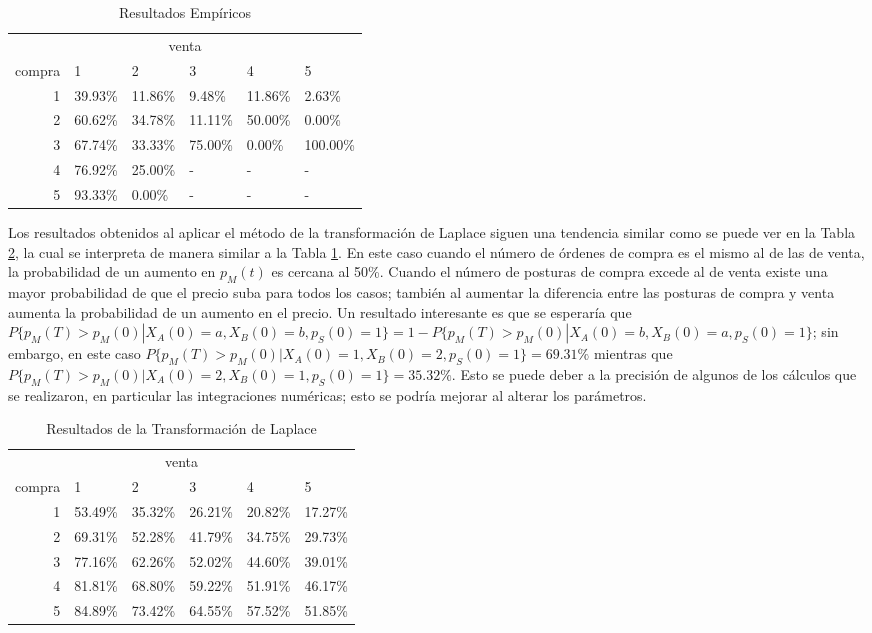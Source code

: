 \documentclass[11pt]{article}
\numberwithin{equation}{section} %
\begin{document}
\begin{table}[htbp]
\centering
\caption{Resultados Empíricos}
\begin{tabular}{r|p{1.5cm}|p{1.5cm}|p{1.5cm}|p{1.5cm}|p{1.5cm}|}
\multicolumn{6}{c}{venta}\\
\cline{2-6}
compra & 1& 2 & 3 & 4 & 5 \\
\cline{2-6}
1 & 39.93\% & 11.86\% & 9.48\% & 11.86\% & 2.63\% \\
2 & 60.62\% & 34.78\% & 11.11\% & 50.00\% & 0.00\% \\
3 & 67.74\% & 33.33\% & 75.00\% & 0.00\% & 100.00\% \\
4 & 76.92\% & 25.00\% & - & - & - \\
5 & 93.33\% & 0.00\% & - & - & - \\
\cline{2-6}
\end{tabular}%
\label{tab:resempirca}%
\end{table}%

Los resultados obtenidos al aplicar el método de la transformación de Laplace siguen una tendencia similar como se puede ver en la Tabla \ref{tab:reslaplace}, la cual se interpreta de manera similar a la Tabla \ref{tab:resempirca}. En este caso cuando el número de órdenes de compra es el mismo al de las de venta, la probabilidad de un aumento en $p_M(t)$ es cercana al 50\%. Cuando el número de posturas de compra excede al de venta existe una mayor probabilidad de que el precio suba para todos los casos; también al aumentar la diferencia entre las posturas de compra y venta aumenta la probabilidad de un aumento en el precio. Un resultado interesante es que se esperaría que $P\{p_M(T)>p_M(0)|X_A(0)=a,X_B(0)=b,p_S(0)=1\}=1-P\{p_M(T)>p_M(0)|X_A(0)=b,X_B(0)=a,p_S(0)=1\}$; sin embargo, en este caso $P\{p_M(T)>p_M(0)|X_A(0)=1,X_B(0)=2,p_S(0)=1\}=69.31\%$ mientras que $P\{p_M(T)>p_M(0)|X_A(0)=2,X_B(0)=1,p_S(0)=1\}=35.32\%$. Esto se puede deber a la precisión de algunos de los cálculos que se realizaron, en particular las integraciones numéricas; esto se podría mejorar al alterar los parámetros.\\

\begin{table}[htbp]
\centering
\caption{Resultados de la Transformación de Laplace}
\begin{tabular}{r|p{1.5cm}|p{1.5cm}|p{1.5cm}|p{1.5cm}|p{1.5cm}|}
\multicolumn{6}{c}{venta}\\
\cline{2-6}
compra & 1& 2 & 3 & 4 & 5 \\
\cline{2-6}
1 & 53.49\% & 35.32\% & 26.21\% & 20.82\% & 17.27\% \\
2 & 69.31\% & 52.28\% & 41.79\% & 34.75\% & 29.73\% \\
3 & 77.16\% & 62.26\% & 52.02\% & 44.60\% & 39.01\% \\
4 & 81.81\% & 68.80\% & 59.22\% & 51.91\% & 46.17\% \\
5 & 84.89\% & 73.42\% & 64.55\% & 57.52\% & 51.85\% \\
\cline{2-6}
\end{tabular}%
\label{tab:reslaplace}%
\end{table}%
\end{document}
